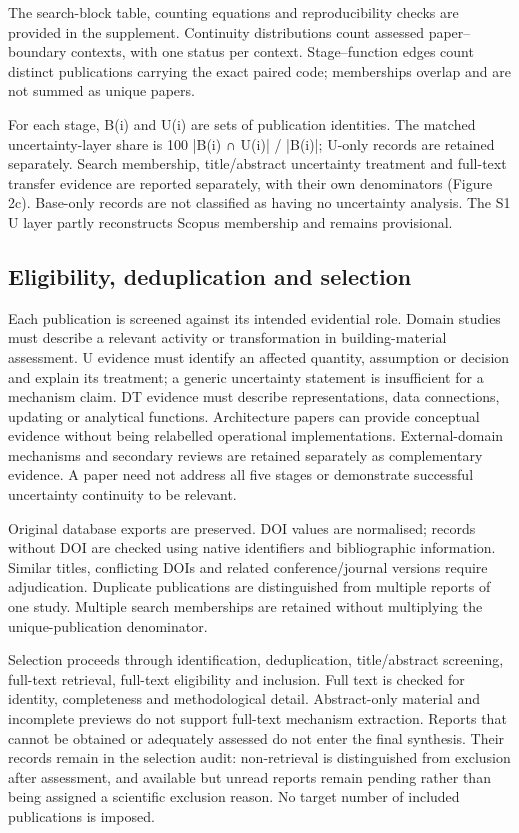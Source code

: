 The search-block table, counting equations and reproducibility checks are provided in the supplement. Continuity distributions count assessed paper–boundary contexts, with one status per context. Stage–function edges count distinct publications carrying the exact paired code; memberships overlap and are not summed as unique papers.

For each stage, B(i) and U(i) are sets of publication identities. The matched uncertainty-layer share is 100 |B(i) ∩ U(i)| / |B(i)|; U-only records are retained separately. Search membership, title/abstract uncertainty treatment and full-text transfer evidence are reported separately, with their own denominators (Figure 2c). Base-only records are not classified as having no uncertainty analysis. The S1 U layer partly reconstructs Scopus membership and remains provisional.


\subsection{Eligibility, deduplication and selection}
Each publication is screened against its intended evidential role. Domain studies must describe a relevant activity or transformation in building-material assessment. U evidence must identify an affected quantity, assumption or decision and explain its treatment; a generic uncertainty statement is insufficient for a mechanism claim. DT evidence must describe representations, data connections, updating or analytical functions. Architecture papers can provide conceptual evidence without being relabelled operational implementations. External-domain mechanisms and secondary reviews are retained separately as complementary evidence. A paper need not address all five stages or demonstrate successful uncertainty continuity to be relevant.

Original database exports are preserved. DOI values are normalised; records without DOI are checked using native identifiers and bibliographic information. Similar titles, conflicting DOIs and related conference/journal versions require adjudication. Duplicate publications are distinguished from multiple reports of one study. Multiple search memberships are retained without multiplying the unique-publication denominator.

Selection proceeds through identification, deduplication, title/abstract screening, full-text retrieval, full-text eligibility and inclusion. Full text is checked for identity, completeness and methodological detail. Abstract-only material and incomplete previews do not support full-text mechanism extraction. Reports that cannot be obtained or adequately assessed do not enter the final synthesis. Their records remain in the selection audit: non-retrieval is distinguished from exclusion after assessment, and available but unread reports remain pending rather than being assigned a scientific exclusion reason. No target number of included publications is imposed.

